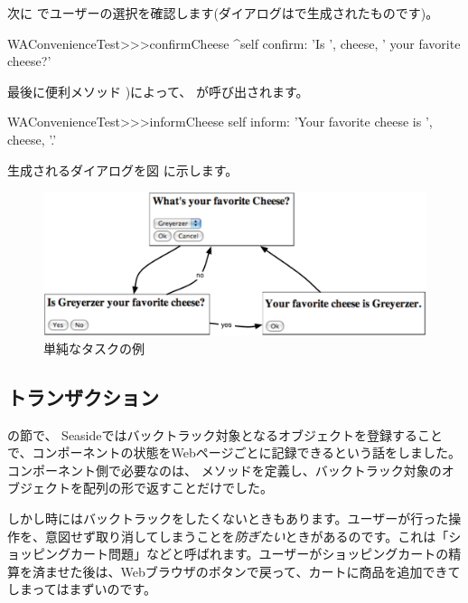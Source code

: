 \documentclass[a4paper,10pt,twoside]{book}
\begin{document}
次に  でユーザーの選択を確認します(ダイアログはで生成されたものです)。

\begin{code}{}
WAConvenienceTest>>>confirmCheese
	^self confirm: 'Is ', cheese,  ' your favorite cheese?'
\end{code}

最後に便利メソッド )によって、 が呼び出されます。

\begin{code}{}
WAConvenienceTest>>>informCheese
	self inform: 'Your favorite cheese is ', cheese, '.'
\end{code}

生成されるダイアログを図 に示します。

\begin{figure}[ht]
\begin{center}
\includegraphics[width=\textwidth]{chooseCheese}
\caption{単純なタスクの例}
\end{center}
\end{figure}

\subsection{トランザクション}

  の節で、 Seasideではバックトラック対象となるオブジェクトを登録することで、コンポーネントの状態をWebページごとに記録できるという話をしました。コンポーネント側で必要なのは、  メソッドを定義し、バックトラック対象のオブジェクトを配列の形で返すことだけでした。

しかし時にはバックトラックをしたくないときもあります。ユーザーが行った操作を、意図せず取り消してしまうことを\emph{防ぎたい}ときがあるのです。これは「ショッピングカート問題」などと呼ばれます。ユーザーがショッピングカートの精算を済ませた後は、Webブラウザのボタンで戻って、カートに商品を追加できてしまってはまずいのです。
\end{document}
